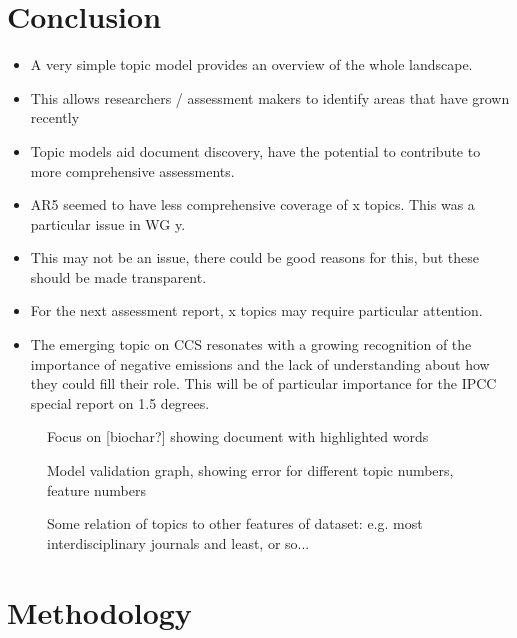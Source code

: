 \documentclass{article}
\begin{document}
\section*{Conclusion}
\begin{itemize}
	\item A very simple topic model provides an overview of the whole landscape.
    \item This allows researchers / assessment makers to identify areas that have grown recently
    \item Topic models aid document discovery, have the potential to contribute to more comprehensive assessments.
	\item AR5 seemed to have less comprehensive coverage of x topics. This was a particular issue in WG y.
	\item This may not be an issue, there could be good reasons for this, but these should be made transparent.
	\item For the next assessment report, x topics may require particular attention.
	\item The emerging topic on CCS resonates with a growing recognition of the importance of negative emissions and the lack of understanding about how they could fill their role. This will be of particular importance for the IPCC special report on 1.5 degrees.
\end{itemize}




\begin{figure}
    \caption{Focus on [biochar?] showing document with highlighted words}
\end{figure}

\begin{figure}
    \caption{Model validation graph, showing error for different topic numbers, feature numbers}
\end{figure}


\begin{figure}
    \caption{Some relation of topics to other features of dataset: e.g. most interdisciplinary journals and least, or so...}
\end{figure}


\section*{Methodology}
\end{document}
